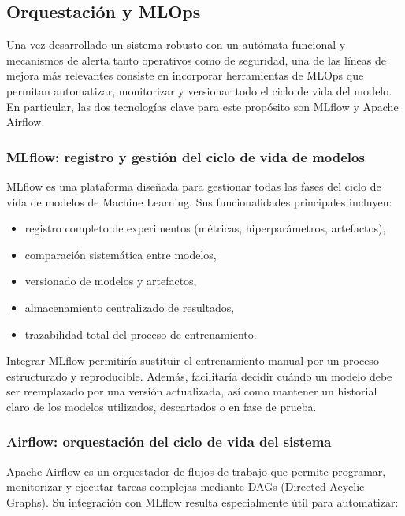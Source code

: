 
\subsection{Orquestación y MLOps}

Una vez desarrollado un sistema robusto con un autómata funcional y mecanismos de alerta tanto operativos como de seguridad, una de las líneas de
mejora más relevantes consiste en incorporar herramientas de MLOps que permitan automatizar, monitorizar y versionar todo el ciclo de vida del modelo.
En particular, las dos tecnologías clave para este propósito son MLflow y Apache Airflow.

\subsubsection{MLflow: registro y gestión del ciclo de vida de modelos}

MLflow es una plataforma diseñada para gestionar todas las fases del ciclo de vida de modelos de Machine Learning. Sus funcionalidades principales
incluyen:

\begin{itemize}
    \item registro completo de experimentos (métricas, hiperparámetros, artefactos),
    \item comparación sistemática entre modelos,
    \item versionado de modelos y artefactos,
    \item almacenamiento centralizado de resultados,
    \item trazabilidad total del proceso de entrenamiento.
\end{itemize}

Integrar MLflow permitiría sustituir el entrenamiento manual por un proceso estructurado y reproducible. Además, facilitaría decidir cuándo un modelo
debe ser reemplazado por una versión actualizada, así como mantener un historial claro de los modelos utilizados, descartados o en fase de prueba.

\subsubsection{Airflow: orquestación del ciclo de vida del sistema}

Apache Airflow es un orquestador de flujos de trabajo que permite programar, monitorizar y ejecutar tareas complejas mediante DAGs (Directed Acyclic
Graphs). Su integración con MLflow resulta especialmente útil para automatizar:

